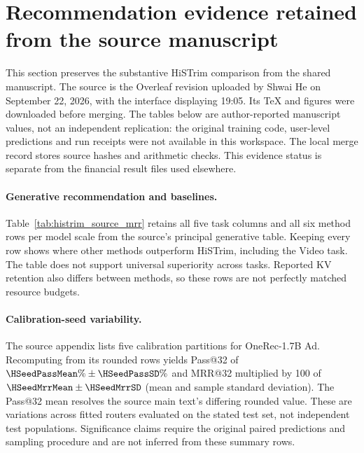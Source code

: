 \section{Recommendation evidence retained from the source manuscript}
\label{app:histrim_evidence}
This section preserves the substantive HiSTrim comparison from the shared manuscript.
The source is the Overleaf revision uploaded by Shwai He on September 22, 2026, with
the interface displaying 19:05. Its TeX and figures were downloaded before merging.
The tables below are author-reported manuscript values, not an independent replication:
the original training code, user-level predictions and run receipts were not available
in this workspace. The local merge record stores source hashes and arithmetic checks.
This evidence status is separate from the financial result files used elsewhere.



\paragraph{Generative recommendation and baselines.}
Table~\ref{tab:histrim_source_mrr} retains all five task columns and all six method
rows per model scale from the source's principal generative table. Keeping every row
shows where other methods outperform HiSTrim, including the Video task. The table
does not support universal superiority across tasks. Reported KV retention also
differs between methods, so these rows are not perfectly matched resource budgets.

\paragraph{Calibration-seed variability.}
The source appendix lists five calibration partitions for OneRec-1.7B Ad. Recomputing
from its rounded rows yields Pass@32 of $\HSeedPassMean\%\pm\HSeedPassSD\%$ and
MRR@32 multiplied by 100 of $\HSeedMrrMean\pm\HSeedMrrSD$ (mean and sample standard
deviation). The Pass@32 mean resolves the source main text's differing rounded value.
These are variations across fitted routers evaluated on the stated test set, not
independent test populations. Significance claims require the original paired
predictions and sampling procedure and are not inferred from these summary rows.

